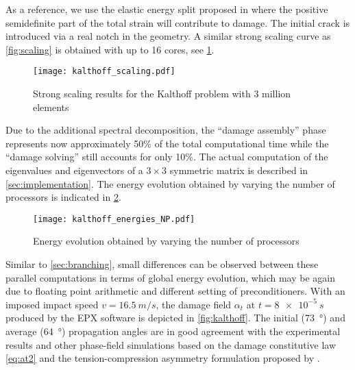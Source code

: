 As a reference, we use the elastic energy split proposed in \cite{FreddiRoyer-Carfagni:2010} where the positive semidefinite part of the total strain will contribute to damage. The initial crack is introduced via a real notch in the geometry. A similar strong scaling curve as \cref{fig:scaling} is obtained with up to 16 cores, see \cref{fig:kalscaling}.
\begin{figure}[htbp]
\centering
\texttt{[image: kalthoff\_scaling.pdf]}
\caption{Strong scaling results for the Kalthoff problem with 3 million elements} \label{fig:kalscaling}
\end{figure}
Due to the additional spectral decomposition, the ``damage assembly'' phase represents now approximately 50\% of the total computational time while the ``damage solving'' still accounts for only 10\%. The actual computation of the eigenvalues and eigenvectors of a $3\times 3$ symmetric matrix is described in \cref{sec:implementation}. The energy evolution obtained by varying the number of processors is indicated in \cref{fig:kalenergy}.
\begin{figure}[htbp]
\centering
\texttt{[image: kalthoff\_energies\_NP.pdf]}
\caption{Energy evolution obtained by varying the number of processors} \label{fig:kalenergy}
\end{figure}
Similar to \cref{sec:branching}, small differences can be observed between these parallel computations in terms of global energy evolution, which may be again due to floating point arithmetic and different setting of preconditioners. With an imposed impact speed $v=\SI{16.5}{m/s}$, the damage field $\alpha_t$ at $t=\SI{8e-5}{s}$ produced by the EPX software is depicted in \cref{fig:kalthoff}. The initial (\SI{73}{\degree}) and average (\SI{64}{\degree}) propagation angles are in good agreement with the experimental results and other phase-field simulations \cite{BordenVerhooselScottHughesLandis:2012,HofackerMiehe:2012} based on the damage constitutive law \eqref{eq:at2} and the tension-compression asymmetry formulation proposed by \cite{MieheHofackerWelschinger:2010}.

